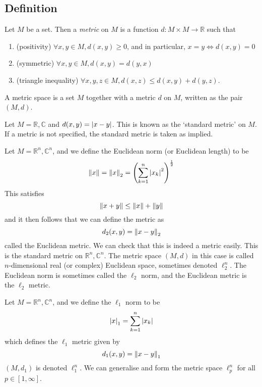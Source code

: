 \subsection{Definition}
\begin{definition}
	Let \( M \) be a set.
	Then a \textit{metric} on \( M \) is a function \( d \colon M \times M \to \mathbb R \) such that
	\begin{enumerate}
		\item (positivity) \( \forall x,y \in M, d(x,y) \geq 0 \), and in particular, \( x = y \iff d(x,y) = 0 \)
		\item (symmetric) \( \forall x,y \in M, d(x,y) = d(y,x) \)
		\item (triangle inequality) \( \forall x,y,z \in M, d(x,z) \leq d(x,y) + d(y,z) \).
	\end{enumerate}
	A metric space is a set \( M \) together with a metric \( d \) on \( M \), written as the pair \( (M, d) \).
\end{definition}
\begin{example}
	Let \( M = \mathbb R, \mathbb C \) and \( d(x,y) = \abs{x-y} \).
	This is known as the `standard metric' on \( M \).
	If a metric is not specified, the standard metric is taken as implied.
\end{example}
\begin{example}
	Let \( M = \mathbb R^n, \mathbb C^n \), and we define the Euclidean norm (or Euclidean length) to be
	\[
		\norm{x} = \norm{x}_2 = \qty(\sum_{k=1}^n \abs{x_k}^2)^{\frac{1}{2}}
	\]
	This satisfies
	\[
		\norm{x+y} \leq \norm{x} + \norm{y}
	\]
	and it then follows that we can define the metric as
	\[
		d_2(x,y) = \norm{x-y}_2
	\]
	called the Euclidean metric.
	We can check that this is indeed a metric easily.
	This is the standard metric on \( \mathbb R^n, \mathbb C^n \).
	The metric space \( (M, d) \) in this case is called \( n \)-dimensional real (or complex) Euclidean space, sometimes denoted \( \ell_2^n \).
	The Euclidean norm is sometimes called the \( \ell_2 \) norm, and the Euclidean metric is the \( \ell_2 \) metric.
\end{example}
\begin{example}
	Let \( M = \mathbb R^n, \mathbb C^n \), and we define the \( \ell_1 \) norm to be
	\[
		\abs{x}_1 = \sum_{k=1}^n \abs{x_k}
	\]
	which defines the \( \ell_1 \) metric given by
	\[
		d_1(x,y) = \norm{x-y}_1
	\]
	\( (M, d_1) \) is denoted \( \ell_1^n \).
	We can generalise and form the metric space \( \ell_p^n \) for all \( p \in [1, \infty] \).
\end{example}
